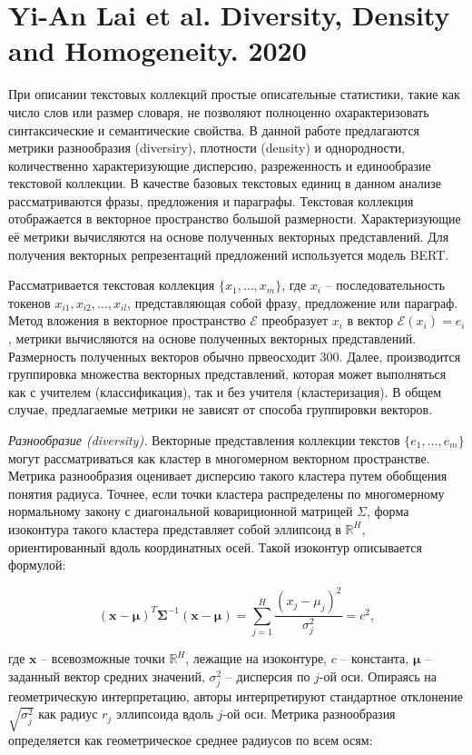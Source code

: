 \section{Yi-An Lai et al. Diversity, Density and Homogeneity. 2020}

При описании текстовых коллекций простые описательные статистики, такие как число слов или размер словаря, не позволяют полноценно охарактеризовать синтаксические и семантические свойства. В данной работе предлагаются метрики разнообразия (diversiry), плотности (density) и однородности, количественно характеризующие дисперсию, разреженность и единообразие текстовой коллекции. В качестве базовых текстовых единиц в данном анализе рассматриваются фразы, предложения и параграфы. Текстовая коллекция отображается в векторное пространство большой размерности. Характеризующие её метрики вычисляются на основе полученных векторных представлений. Для получения векторных репрезентаций предложений используется модель BERT. 

Рассматривается текстовая коллекция $\{x_1, \ldots, x_m\}$, где $x_i$ -- последовательность токенов $x_{i1}, x_{i2}, \ldots, x_{il}$, представляющая собой фразу, предложение или параграф. Метод вложения в векторное пространство $\mathcal{E}$ преобразует $x_i$ в вектор $\mathcal{E}(x_i) = e_i$, метрики вычисляются на основе полученных векторных представлений. Размерность полученных векторов обычно првеосходит 300. Далее, производится группировка множества векторных представлений, которая может выполняться как с учителем (классификация), так и без учителя (кластеризация). В общем случае, предлагаемые метрики не зависят от способа группировки векторов.

\textit{Разнообразие (diversity).} Векторные представления коллекции текстов $\{e_1, \ldots, e_m\}$ могут рассматриваться как кластер в многомерном векторном пространстве. Метрика разнообразия оценивает дисперсию такого кластера путем обобщения понятия радиуса. Точнее, если точки кластера распределены по многомерному нормальному закону с диагональной ковариционной матрицей $\Sigma$, форма изоконтура такого кластера представляет собой эллипсоид в $\mathbb{R}^H$, ориентированный вдоль координатных осей. Такой изоконтур описывается формулой:

\[(\bm{x}-\bm{\mu})^T\bm{\Sigma}^{-1}(\bm{x}-\bm{\mu}) = \sum_{j=1}^{H}\frac{(x_j-\mu_j)^2}{\sigma_j^2} = c^2,\]

\noindent где $\bm{x}$ -- всевозможные точки $\mathbb{R}^H$, лежащие на изоконтуре, $c$ -- константа, $\bm{\mu}$ -- заданный вектор средних значений, $\sigma_j^2$ -- дисперсия по $j$-ой оси. Опираясь на геометрическую интерпретацию, авторы интерпретируют стандартное отклонение $\sqrt{\sigma_j^2}$  как радиус $r_j$ эллипсоида вдоль $j$-ой оси. Метрика разнообразия определяется как геометрическое среднее радиусов по всем осям: 

